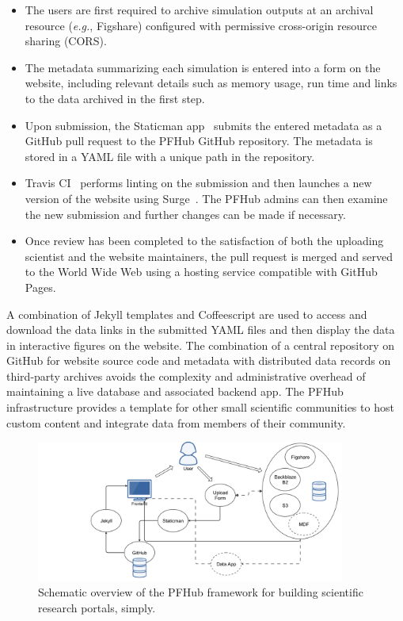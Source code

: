 \documentclass{jors}
\begin{document}
\begin{itemize}
  \item The users are first required to archive simulation outputs at
    an archival resource (\emph{e.g.}, Figshare) configured with
    permissive cross-origin resource sharing (CORS).
  \item The metadata summarizing each simulation is entered into a
    form on the website, including relevant details such as memory
    usage, run time and links to the data archived in the first step.
  \item Upon submission, the Staticman app~\cite{staticman} submits
    the entered metadata as a GitHub pull request to the PFHub GitHub
    repository.  The metadata is stored in a YAML file with a unique
    path in the repository.
  \item Travis CI~\cite{travis} performs linting on the submission and
    then launches a new version of the website using
    Surge~\cite{surge}. The PFHub admins can then examine the new
    submission and further changes can be made if necessary.
  \item Once review has been completed to the satisfaction of both the
    uploading scientist and the website maintainers, the pull request
    is merged and served to the World Wide Web using a hosting service
    compatible with GitHub Pages.
\end{itemize}

A combination of Jekyll templates and Coffeescript are used to access
and download the data links in the submitted YAML files and then
display the data in interactive figures on the website. The
combination of a central repository on GitHub for website source code
and metadata with distributed data records on third-party archives
avoids the complexity and administrative overhead of maintaining a
live database and associated backend app. The PFHub infrastructure
provides a template for other small scientific communities to host
custom content and integrate data from members of their community.

\begin{figure}
  \includegraphics[width=4in]{pfhub_website.png}
  \caption{Schematic overview of the PFHub framework for building
    scientific research portals, simply.}
  \centering
  \label{fig:pfhub_website}
\end{figure}
\end{document}
